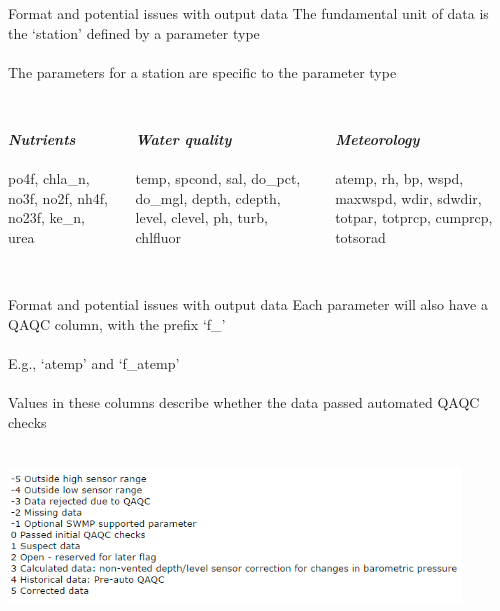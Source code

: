 \documentclass[xcolor=svgnames]{beamer}\usepackage[]{graphicx}\usepackage[]{color}
\newcommand{\Bigtxt}[1]{\textbf{\textit{#1}}}
\begin{document}
\begin{frame}{Format and potential issues with output data}
\onslide<+->
The fundamental unit of data is the `station' defined by a parameter type \\~\\
The parameters for a station are specific to the parameter type \\~\\
\onslide<+->
\begin{columns}[t]
\begin{column}{0.3\textwidth}
\Bigtxt{Nutrients} \\~\\
po4f, chla\_n, no3f, no2f, nh4f, no23f, ke\_n, urea
\end{column}
\begin{column}{0.3\textwidth}
\Bigtxt{Water quality} \\~\\
temp, spcond, sal, do\_pct, do\_mgl, depth, cdepth, level, clevel, ph, turb, chlfluor
\end{column}
\begin{column}{0.3\textwidth}
\Bigtxt{Meteorology} \\~\\
atemp, rh, bp, wspd, maxwspd, wdir, sdwdir, totpar, totprcp, cumprcp, totsorad \\~\\
\end{column}
\end{columns}
\end{frame}

\begin{frame}{Format and potential issues with output data}
Each parameter will also have a QAQC column, with the prefix `f\_' \\~\\
E.g., `atemp' and `f\_atemp' \\~\\
Values in these columns describe whether the data passed automated QAQC checks \\~\\
\centerline{\includegraphics[width = 0.9\textwidth]{qaqc_flags.png}}
\end{frame}
\end{document}
